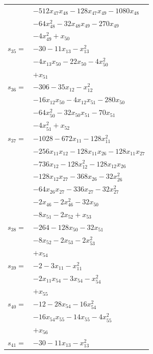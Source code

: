 \begin{longtable}{@{}r@{\;}l@{}}
 & \(\displaystyle -512x_{47}x_{48} -128x_{47}x_{49} -1080x_{48}\) \\
 & \(\displaystyle -64x_{48}^{2} -32x_{48}x_{49} -270x_{49}\) \\
 & \(\displaystyle -4x_{49}^{2} +x_{50}\) \\[3pt]
\(s_{35}=\) & \(\displaystyle -30 -11x_{13} -x_{13}^{2}\) \\
 & \(\displaystyle -4x_{13}x_{50} -22x_{50} -4x_{50}^{2}\) \\
 & \(\displaystyle +x_{51}\) \\[3pt]
\(s_{36}=\) & \(\displaystyle -306 -35x_{12} -x_{12}^{2}\) \\
 & \(\displaystyle -16x_{12}x_{50} -4x_{12}x_{51} -280x_{50}\) \\
 & \(\displaystyle -64x_{50}^{2} -32x_{50}x_{51} -70x_{51}\) \\
 & \(\displaystyle -4x_{51}^{2} +x_{52}\) \\[3pt]
\(s_{37}=\) & \(\displaystyle -1028 -672x_{11} -128x_{11}^{2}\) \\
 & \(\displaystyle -256x_{11}x_{12} -128x_{11}x_{26} -128x_{11}x_{27}\) \\
 & \(\displaystyle -736x_{12} -128x_{12}^{2} -128x_{12}x_{26}\) \\
 & \(\displaystyle -128x_{12}x_{27} -368x_{26} -32x_{26}^{2}\) \\
 & \(\displaystyle -64x_{26}x_{27} -336x_{27} -32x_{27}^{2}\) \\
 & \(\displaystyle -2x_{46} -2x_{46}^{2} -32x_{50}\) \\
 & \(\displaystyle -8x_{51} -2x_{52} +x_{53}\) \\[3pt]
\(s_{38}=\) & \(\displaystyle -264 -128x_{50} -32x_{51}\) \\
 & \(\displaystyle -8x_{52} -2x_{53} -2x_{53}^{2}\) \\
 & \(\displaystyle +x_{54}\) \\[3pt]
\(s_{39}=\) & \(\displaystyle -2 -3x_{11} -x_{11}^{2}\) \\
 & \(\displaystyle -2x_{11}x_{54} -3x_{54} -x_{54}^{2}\) \\
 & \(\displaystyle +x_{55}\) \\[3pt]
\(s_{40}=\) & \(\displaystyle -12 -28x_{54} -16x_{54}^{2}\) \\
 & \(\displaystyle -16x_{54}x_{55} -14x_{55} -4x_{55}^{2}\) \\
 & \(\displaystyle +x_{56}\) \\[3pt]
\(s_{41}=\) & \(\displaystyle -30 -11x_{13} -x_{13}^{2}\) \\

\end{longtable}
